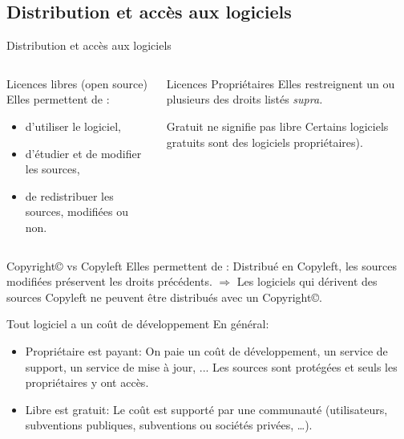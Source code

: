 \subsection{Distribution et accès aux logiciels}
\begin{frame}{Distribution et accès aux logiciels}
  \begin{columns}
    \begin{column}{6cm}
      \begin{block}{Licences libres (open source)}
        Elles permettent de :
        \begin{itemize}
        \item d'utiliser le logiciel,
        \item d'étudier et de modifier les sources,
        \item de redistribuer les sources, modifiées ou non.
        \end{itemize}
      \end{block}
    \end{column}
    \begin{column}{5cm}
      \begin{block}{Licences Propriétaires}
        Elles restreignent un ou plusieurs des droits listés \it{supra}.
      \end{block}
      \begin{block}{Gratuit ne signifie pas libre}
        Certains logiciels gratuits sont des logiciels propriétaires).
      \end{block}
    \end{column}
  \end{columns}
  \begin{block}{Copyright\copyright{} vs Copyleft\textcopyleft}
    Elles permettent de : Distribué en Copyleft\textcopyleft, les
    sources modifiées préservent les droits précédents.  $\Rightarrow$
    Les logiciels qui dérivent des sources Copyleft ne peuvent être
    distribués avec un Copyright\copyright.
  \end{block}
  \begin{block}{Tout logiciel a un coût de développement}
    En général:
    \begin{itemize}
    \item Propriétaire est payant: On paie un coût de développement, un
      service de support, un service de mise à jour, ... Les sources
      sont protégées et seuls les propriétaires y ont accès.
    \item Libre est gratuit: Le coût est supporté par une communauté
      (utilisateurs, subventions publiques, subventions ou sociétés
      privées, \dots).
    \end{itemize}
  \end{block}
\end{frame}

